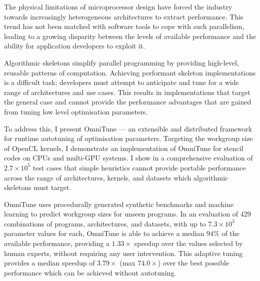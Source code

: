 The physical limitations of microprocessor design have forced the
industry towards increasingly heterogeneous architectures to extract
performance. This trend has not been matched with software tools to
cope with such parallelism, leading to a growing disparity between the
levels of available performance and the ability for application
developers to exploit it.

Algorithmic skeletons simplify parallel programming by providing
high-level, reusable patterns of computation. Achieving performant
skeleton implementations is a difficult task; developers must attempt
to anticipate and tune for a wide range of architectures and use
cases. This results in implementations that target the general case
and cannot provide the performance advantages that are gained from
tuning low level optimisation parameters.

To address this, I present OmniTune --- an extensible and distributed
framework for runtime autotuning of optimisation parameters. Targeting
the workgroup size of OpenCL kernels, I demonstrate an implementation
of OmniTune for stencil codes on CPUs and multi-GPU systems. I show in
a comprehensive evaluation of $2.7\times 10^5$ test cases that simple
heuristics cannot provide portable performance across the range of
architectures, kernels, and datasets which algorithmic skeletons must
target.

OmniTune uses procedurally generated synthetic benchmarks and machine
learning to predict workgroup sizes for unseen programs. In an
evaluation of 429 combinations of programs, architectures, and
datasets, with up to $7.3\times 10^3$ parameter values for each,
OmniTune is able to achieve a median $94\%$ of the available
performance, providing a $1.33\times$ speedup over the values selected
by human experts, without requiring any user intervention. This
adaptive tuning provides a median speedup of $3.79\times$ (max
$74.0\times$) over the best possible performance which can be achieved
without autotuning.
